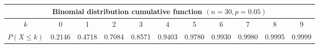 \documentclass[10pt]{article}
\begin{document}
\begin{center}
    \begin{tabular}{|c|c|c|c|c|c|c|c|c|c|c|}
    \hline
    \multicolumn{11}{|c|}{Binomial distribution cumulative function $(n=30, p=0.05)$}\\
    \hline
    \hline
    $k$ & 0 & 1 & 2 & 3 & 4 & 5 & 6 & 7 & 8 & 9 \\
    \hline
    $P(X \leq k)$ & 0.2146 & 0.4718 & 0.7084 & 0.8571 & 0.9403 & 0.9780 & 0.9930 & 0.9980 & 0.9995 & 0.9999 \\
    \hline
\end{tabular}
\end{center}


\end{document}
